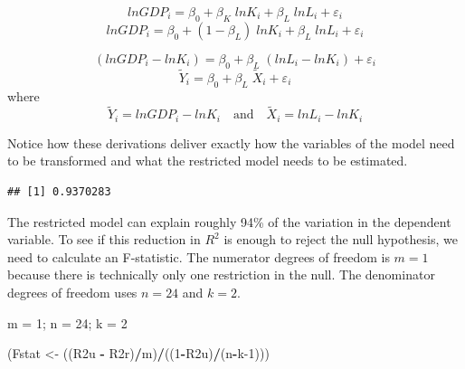 \documentclass[
]{book}
\newenvironment{Shaded}{\begin{snugshade}}{\end{snugshade}}
\newcommand{\DecValTok}[1]{\textcolor[rgb]{0.00,0.00,0.81}{#1}}
\newcommand{\FunctionTok}[1]{\textcolor[rgb]{0.13,0.29,0.53}{\textbf{#1}}}
\newcommand{\NormalTok}[1]{#1}
\newcommand{\OtherTok}[1]{\textcolor[rgb]{0.56,0.35,0.01}{#1}}
\newcommand{\SpecialCharTok}[1]{\textcolor[rgb]{0.81,0.36,0.00}{\textbf{#1}}}
\begin{document}
\[lnGDP_i = \beta_0 + \beta_K \; lnK_i + \beta_L \; lnL_i + \varepsilon_i\]
\[lnGDP_i = \beta_0 + (1 - \beta_L) \; lnK_i + \beta_L \; lnL_i + \varepsilon_i\]

\[(lnGDP_i - lnK_i) = \beta_0 + \beta_L \; (lnL_i - lnK_i) + \varepsilon_i\]
\[\tilde{Y}_i = \beta_0 + \beta_L \; \tilde{X}_i + \varepsilon_i\]
where
\[\tilde{Y}_i=lnGDP_i - lnK_i \quad \text{and} \quad \tilde{X}_i=lnL_i - lnK_i\]

Notice how these derivations deliver exactly how the variables of the model need to be transformed and what the restricted model needs to be estimated.

\begin{Shaded}
\end{Shaded}

\begin{verbatim}
## [1] 0.9370283
\end{verbatim}

The restricted model can explain roughly 94\% of the variation in the dependent variable. To see if this reduction in \(R^2\) is enough to reject the null hypothesis, we need to calculate an F-statistic. The numerator degrees of freedom is \(m=1\) because there is technically only one restriction in the null. The denominator degrees of freedom uses \(n=24\) and \(k=2\).

\begin{Shaded}
\begin{Highlighting}[]
\NormalTok{m }\OtherTok{=} \DecValTok{1}\NormalTok{; n }\OtherTok{=} \DecValTok{24}\NormalTok{; k }\OtherTok{=} \DecValTok{2}

\NormalTok{(Fstat }\OtherTok{\textless{}{-}}\NormalTok{ ((R2u }\SpecialCharTok{{-}}\NormalTok{ R2r)}\SpecialCharTok{/}\NormalTok{m)}\SpecialCharTok{/}\NormalTok{((}\DecValTok{1}\SpecialCharTok{{-}}\NormalTok{R2u)}\SpecialCharTok{/}\NormalTok{(n}\SpecialCharTok{{-}}\NormalTok{k}\DecValTok{{-}1}\NormalTok{)))}
\end{Highlighting}
\end{Shaded}
\end{document}
